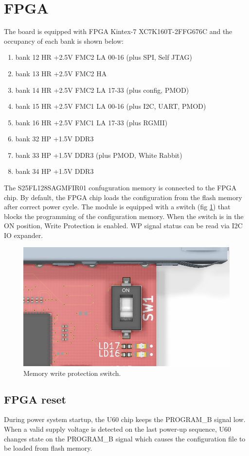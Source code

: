 \documentclass[12pt,oneside,a4]{article}
\begin{document}
\section{FPGA}
The board is equipped with FPGA Kintex-7 XC7K160T-2FFG676C and the occupancy of each bank is shown below:
\begin{enumerate}
	\item bank 12 HR +2.5V FMC2 LA 00-16 (plus SPI, Self JTAG)
	\item bank 13 HR +2.5V FMC2 HA
	\item bank 14 HR +2.5V FMC2 LA 17-33 (plus config, PMOD)
	\item bank 15 HR +2.5V FMC1 LA 00-16 (plus I2C, UART, PMOD)
	\item bank 16 HR +2.5V FMC1 LA 17-33 (plus RGMII)
	\item bank 32 HP +1.5V DDR3 
	\item bank 33 HP +1.5V DDR3 (plus PMOD, White Rabbit)
	\item bank 34 HP +1.5V DDR3
\end{enumerate}

The S25FL128SAGMFIR01 confuguration memory is connected to the FPGA chip. By default, the FPGA chip loads the configuration from the flash memory after correct power cycle. The module is equipped with a switch (fig \ref{bootsw}) that blocks the programming of the configuration memory. When the switch is in the ON position, Write Protection is enabled. WP signal status can be read via I2C IO expander. 
 
\begin{figure}[H]
\begin{center}
\includegraphics[width=0.8\linewidth]{bootsw.png}
 \caption{Memory write protection switch.}\label{bootsw}
\end{center}
\end{figure}

\subsection{FPGA reset}
During power system startup, the U60 chip keeps the PROGRAM\_B signal low. When a valid supply voltage is detected on the last power-up sequence, U60 changes state on the PROGRAM\_B signal which causes the configuration file to be loaded from flash memory.
\end{document}
